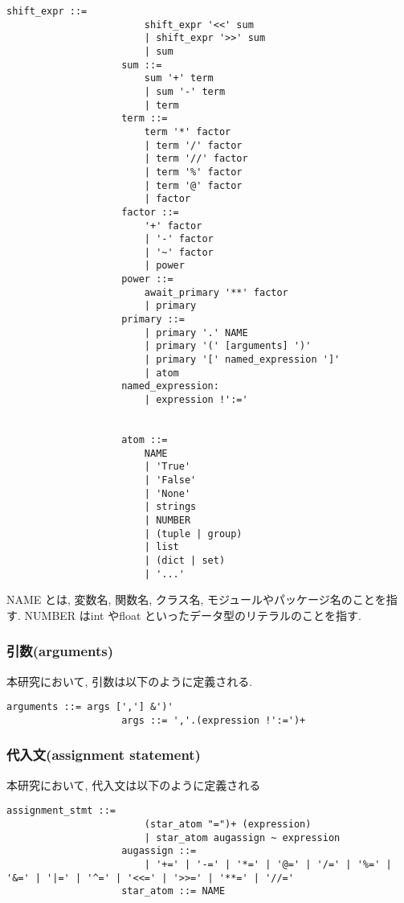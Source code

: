 \documentclass{jlreq}
\begin{document}
\begin{lstlisting}[caption=式の定義]
                    shift_expr ::=
                        shift_expr '<<' sum 
                        | shift_expr '>>' sum 
                        | sum
                    sum ::=
                        sum '+' term 
                        | sum '-' term 
                        | term
                    term ::=
                        term '*' factor 
                        | term '/' factor 
                        | term '//' factor 
                        | term '%' factor 
                        | term '@' factor 
                        | factor
                    factor ::=
                        '+' factor 
                        | '-' factor 
                        | '~' factor 
                        | power
                    power ::=
                        await_primary '**' factor 
                        | primary
                    primary ::=
                        | primary '.' NAME 
                        | primary '(' [arguments] ')' 
                        | primary '[' named_expression ']' 
                        | atom
                    named_expression:
                        | expression !':='


                    atom ::=
                        NAME
                        | 'True' 
                        | 'False' 
                        | 'None' 
                        | strings
                        | NUMBER
                        | (tuple | group)
                        | list
                        | (dict | set)
                        | '...'
                \end{lstlisting}
                NAME とは, 変数名, 関数名, クラス名, モジュールやパッケージ名のことを指す. NUMBER はint やfloat といったデータ型のリテラルのことを指す.
            \subsubsection{引数(arguments)}
                本研究において, 引数は以下のように定義される.
                \begin{lstlisting}[caption=引数の定義,label=fuga]
                    arguments ::= args [','] &')'
                    args ::= ','.(expression !':=')+
                \end{lstlisting}
            \subsubsection{代入文(assignment statement)}
                本研究において, 代入文は以下のように定義される
                \begin{lstlisting}[caption=代入文の定義,label=fuga]
                    assignment_stmt ::=  
                        (star_atom "=")+ (expression)
                        | star_atom augassign ~ expression
                    augassign ::=
                        | '+=' | '-=' | '*=' | '@=' | '/=' | '%=' | '&=' | '|=' | '^=' | '<<=' | '>>=' | '**=' | '//='
                    star_atom ::= NAME
                \end{lstlisting}
\end{document}
